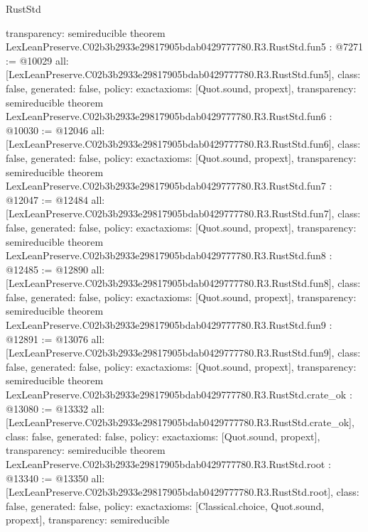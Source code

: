 \begin{lexlean}{RustStd}
\begin{coremodule}
{  transparency: semireducible
}
theorem LexLeanPreserve.C02b3b2933e29817905bdab0429777780.R3.RustStd.fun5 : @7271 := @10029 {
  all: [LexLeanPreserve.C02b3b2933e29817905bdab0429777780.R3.RustStd.fun5],
  class: false,
  generated: false,
  policy: exact{axioms: [Quot.sound, propext]},
  transparency: semireducible
}
theorem LexLeanPreserve.C02b3b2933e29817905bdab0429777780.R3.RustStd.fun6 : @10030 := @12046 {
  all: [LexLeanPreserve.C02b3b2933e29817905bdab0429777780.R3.RustStd.fun6],
  class: false,
  generated: false,
  policy: exact{axioms: [Quot.sound, propext]},
  transparency: semireducible
}
theorem LexLeanPreserve.C02b3b2933e29817905bdab0429777780.R3.RustStd.fun7 : @12047 := @12484 {
  all: [LexLeanPreserve.C02b3b2933e29817905bdab0429777780.R3.RustStd.fun7],
  class: false,
  generated: false,
  policy: exact{axioms: [Quot.sound, propext]},
  transparency: semireducible
}
theorem LexLeanPreserve.C02b3b2933e29817905bdab0429777780.R3.RustStd.fun8 : @12485 := @12890 {
  all: [LexLeanPreserve.C02b3b2933e29817905bdab0429777780.R3.RustStd.fun8],
  class: false,
  generated: false,
  policy: exact{axioms: [Quot.sound, propext]},
  transparency: semireducible
}
theorem LexLeanPreserve.C02b3b2933e29817905bdab0429777780.R3.RustStd.fun9 : @12891 := @13076 {
  all: [LexLeanPreserve.C02b3b2933e29817905bdab0429777780.R3.RustStd.fun9],
  class: false,
  generated: false,
  policy: exact{axioms: [Quot.sound, propext]},
  transparency: semireducible
}
theorem LexLeanPreserve.C02b3b2933e29817905bdab0429777780.R3.RustStd.crate_ok : @13080 := @13332 {
  all: [LexLeanPreserve.C02b3b2933e29817905bdab0429777780.R3.RustStd.crate_ok],
  class: false,
  generated: false,
  policy: exact{axioms: [Quot.sound, propext]},
  transparency: semireducible
}
theorem LexLeanPreserve.C02b3b2933e29817905bdab0429777780.R3.RustStd.root : @13340 := @13350 {
  all: [LexLeanPreserve.C02b3b2933e29817905bdab0429777780.R3.RustStd.root],
  class: false,
  generated: false,
  policy: exact{axioms: [Classical.choice, Quot.sound, propext]},
  transparency: semireducible
}


\end{coremodule}
\end{lexlean}
